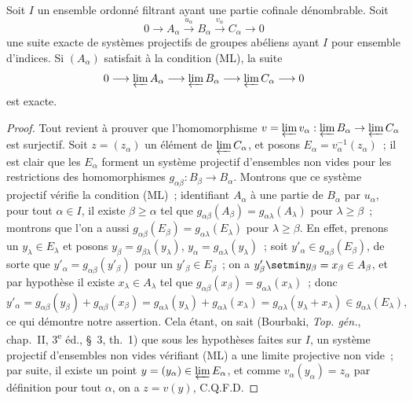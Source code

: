 \begin{proposition}[13.2.2]
\label{0.13.2.2-fr}
Soit $I$ un ensemble ordonné filtrant ayant une partie cofinale
dénombrable. Soit
\[
0\longrightarrow A_\alpha\xrightarrow{u_\alpha}B_\alpha
\xrightarrow{v_\alpha}C_\alpha\longrightarrow0
\]
une suite exacte de systèmes projectifs de groupes abéliens ayant
$I$ pour ensemble d'indices. Si $(A_\alpha)$ satisfait à la condition
\textup{(ML)}, la suite
\[
0\longrightarrow\varprojlim A_\alpha
\longrightarrow\varprojlim B_\alpha
\longrightarrow\varprojlim C_\alpha\longrightarrow0
\]
est exacte.
\end{proposition}

\begin{proof}
Tout revient à prouver que l'homomorphisme
$v=\varprojlim v_\alpha:\varprojlim B_\alpha\to\varprojlim C_\alpha$
est surjectif. Soit $z=(z_\alpha)$ un élément de
$\varprojlim C_\alpha$, et posons
$E_\alpha=v_\alpha^{-1}(z_\alpha)$~; il est clair que les $E_\alpha$
forment un système projectif d'ensembles non vides pour les restrictions
des homomorphismes $g_{\alpha\beta}:B_\beta\to B_\alpha$. Montrons que ce
système projectif vérifie la condition (ML)~; identifiant $A_\alpha$ à une
partie de $B_\alpha$ par $u_\alpha$, pour tout $\alpha\in I$, il existe
$\beta\geq\alpha$ tel que
$g_{\alpha\beta}(A_\beta)=g_{\alpha\lambda}(A_\lambda)$ pour
$\lambda\geq\beta$~; montrons que l'on a aussi
$g_{\alpha\beta}(E_\beta)=g_{\alpha\lambda}(E_\lambda)$ pour
$\lambda\geq\beta$. En effet, prenons un $y_\lambda\in E_\lambda$ et
posons $y_\beta=g_{\beta\lambda}(y_\lambda)$,
$y_\alpha=g_{\alpha\lambda}(y_\lambda)$~; soit
$y'_\alpha\in g_{\alpha\beta}(E_\beta)$, de sorte que
$y'_\alpha=g_{\alpha\beta}(y'_\beta)$ pour un $y'_\beta\in E_\beta$~;
on a $y'_\beta\setmin y_\beta=x_\beta\in A_\beta$, et par hypothèse il existe
$x_\lambda\in A_\lambda$ tel que
$g_{\alpha\beta}(x_\beta)=g_{\alpha\lambda}(x_\lambda)$~; donc
\[
y'_\alpha=g_{\alpha\beta}(y_\beta)+g_{\alpha\beta}(x_\beta)
=g_{\alpha\lambda}(y_\lambda)+g_{\alpha\lambda}(x_\lambda)
=g_{\alpha\lambda}(y_\lambda+x_\lambda)
\in g_{\alpha\lambda}(E_\lambda),
\]
ce qui démontre notre assertion. Cela étant, on sait (Bourbaki,
\emph{Top. gén.}, chap.~II, 3\textsuperscript{e} éd., §~3, th.~1) que sous
les hypothèses faites sur $I$, un système projectif d'ensembles non vides
vérifiant (ML) a une limite projective non vide~; par suite, il existe un
point $y=(y_\alpha)\in\varprojlim E_\alpha$, et comme
$v_\alpha(y_\alpha)=z_\alpha$ par définition pour tout $\alpha$, on a
$z=v(y)$, C.Q.F.D.
\end{proof}


